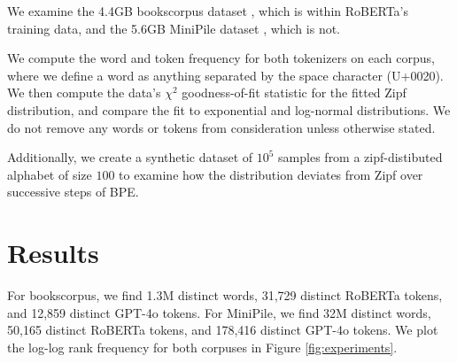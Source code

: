 \documentclass[11pt]{article}
\begin{document}
We examine the 4.4GB bookscorpus dataset \cite{zhu2015aligningbooksmoviesstorylike}, which is within RoBERTa's training data, and the 5.6GB MiniPile dataset \cite{kaddour2023minipilechallengedataefficientlanguage}, which is not.

We compute the word and token frequency for both tokenizers on each corpus, where we define a word as anything separated by the space character (U+0020). We then compute the data's $\chi^2$ goodness-of-fit statistic for the fitted Zipf distribution, and compare the fit to exponential and log-normal distributions. We do not remove any words or tokens from consideration unless otherwise stated.

Additionally, we create a synthetic dataset of $10^5$ samples from a zipf-distibuted alphabet of size $100$ to examine how the distribution deviates from Zipf over successive steps of BPE. 

\section{Results}

For bookscorpus, we find 1.3M distinct words, 31,729 distinct RoBERTa tokens, and 12,859 distinct GPT-4o tokens. For MiniPile, we find 32M distinct words, 50,165 distinct RoBERTa tokens, and 178,416 distinct GPT-4o tokens. We plot the log-log rank frequency for both corpuses in Figure \ref{fig:experiments}. 
\end{document}
